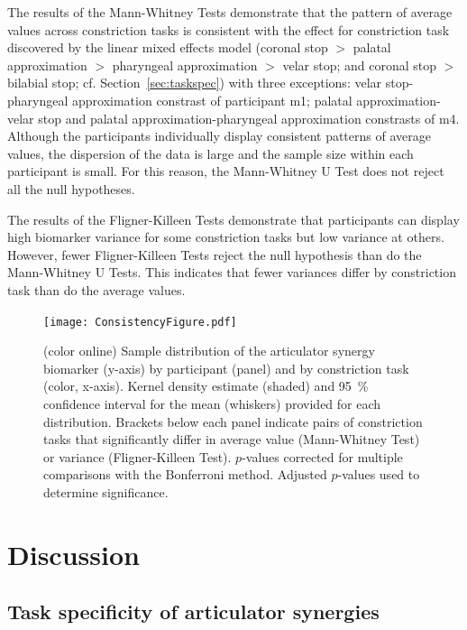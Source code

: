 \documentclass[preprint]{JASAnew}\usepackage[]{graphicx}\usepackage[]{color}
\begin{document}
The results of the Mann-Whitney Tests demonstrate that the pattern of average values across constriction tasks is consistent with the effect for constriction task discovered by the linear mixed effects model (coronal stop $>$ palatal approximation $>$ pharyngeal approximation $>$ velar stop; and coronal stop $>$ bilabial stop; cf. Section~\ref{sec:taskspec}) with three exceptions: velar stop-pharyngeal approximation constrast of participant m1; palatal approximation-velar stop and palatal approximation-pharyngeal approximation constrasts of m4.
Although the participants individually display consistent patterns of average values, the dispersion of the data is large and the sample size within each participant is small.
For this reason, the Mann-Whitney U Test does not reject all the null hypotheses.

The results of the Fligner-Killeen Tests demonstrate that participants can display high biomarker variance for some constriction tasks but low variance at others. However, fewer Fligner-Killeen Tests reject the null hypothesis than do the Mann-Whitney U Tests. This indicates that fewer variances differ by constriction task than do the average values.

\begin{figure}

\texttt{[image: ConsistencyFigure.pdf]}

\caption{(color online) Sample distribution of the articulator synergy biomarker (y-axis) by participant (panel) and by constriction task (color, x-axis). Kernel density estimate (shaded) and \SI{95}{\percent} confidence interval for the mean (whiskers) provided for each distribution.
%
Brackets below each panel indicate pairs of constriction tasks that significantly differ in average value (Mann-Whitney Test) or variance (Fligner-Killeen Test). $p$-values corrected for multiple comparisons with the Bonferroni method. Adjusted $p$-values used to determine significance.}
\label{fig:consistency}
\end{figure}






\section{Discussion}
\label{sec:discussion}

\subsection{Task specificity of articulator synergies}
\end{document}
